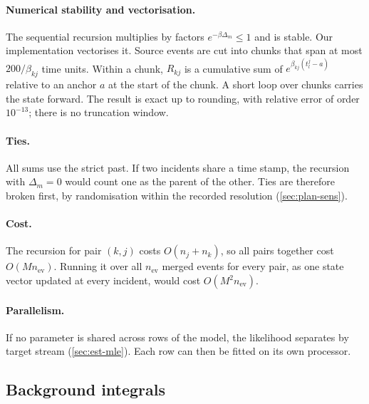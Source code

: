 \paragraph{Numerical stability and vectorisation.} The sequential recursion multiplies by
factors $e^{-\beta\Delta_m}\le1$ and is stable. Our implementation vectorises it. Source
events are cut into chunks that span at most $200/\beta_{kj}$ time units. Within a chunk,
$R_{kj}$ is a cumulative sum of $e^{\beta_{kj}(t^j_l-a)}$ relative to an anchor $a$ at
the start of the chunk. A short loop over chunks carries the state forward. The result is
exact up to rounding, with relative error of order $10^{-13}$; there is no truncation
window.

\paragraph{Ties.} All sums use the strict past. If two incidents share a time stamp, the
recursion with $\Delta_m=0$ would count one as the parent of the other. Ties are therefore
broken first, by randomisation within the recorded resolution (\cref{sec:plan-sens}).

\paragraph{Cost.} The recursion for pair $(k,j)$ costs $O(n_j+n_k)$, so all pairs together
cost $O(Mn_{\mathrm{ev}})$. Running it over all $n_{\mathrm{ev}}$ merged events for every pair, as one
state vector updated at every incident, would cost $O(M^2n_{\mathrm{ev}})$.

\paragraph{Parallelism.} If no parameter is shared across rows of the model, the
likelihood separates by target stream (\cref{sec:est-mle}). Each row can then be fitted
on its own processor.

\subsection{Background integrals}\label{app:comp-bg}

